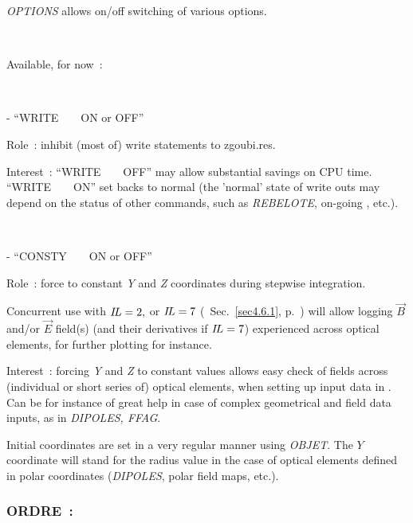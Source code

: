 {\medskip

\textsl{OPTIONS} allows on/off switching of various options. 

~

\noindent Available, for now~: 

~

\noindent - ``WRITE ~ ~   ON or OFF''

Role~: inhibit (most of) write statements to zgoubi.res. 

\smallskip 

\noindent Interest~: ``WRITE ~ ~   OFF'' may allow substantial savings on CPU time. 
``WRITE ~ ~   ON'' set backs to normal (the 'normal' state of write outs may depend on 
the status of other commands, such as \textsl{REBELOTE}, on-going , etc.). 

~

\noindent - ``CONSTY ~ ~   ON or OFF''

Role~: force to constant \textsl{Y} and \textsl{Z} coordinates during stepwise integration. 


\smallskip 

\noindent Concurrent use with $I\!L=2, $ or $I\!L=7$ (\cf\ Sec.~\ref{sec4.6.1}, p.~\pageref{sec4.6.1}) will allow logging 
 $\vec B$ and/or $\vec E$ field(s) (and their derivatives if $I\!L=7$) 
experienced across optical elements, for further plotting for instance. 

\noindent Interest~:  forcing  \textsl{Y} and \textsl{Z} to constant values allows easy check of fields across 
(individual or short series of) optical elements, when setting up input data in \zgou. Can be for instance of great help 
in case of complex geometrical and field data inputs, as in \textsl{DIPOLES, FFAG}.  

\noindent Initial coordinates are set in a very regular manner using \textsl{OBJET}. The $Y$ coordinate will stand for the 
radius value in the case of optical elements defined in polar coordinates (\textsl{DIPOLES}, polar field maps, etc.).  










 \newpage

\subsubsection{ORDRE~: \ORDRETitl } \label{ORDRE} 
\medskip

}
